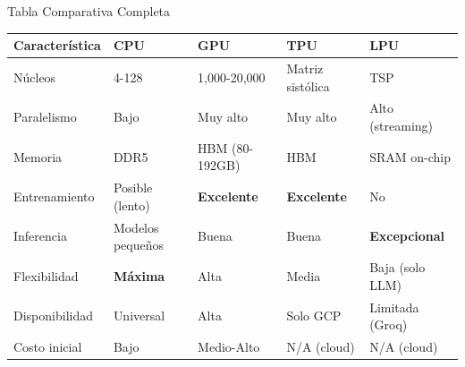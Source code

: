\documentclass[aspectratio=169]{beamer}
\begin{document}
\begin{frame}{Tabla Comparativa Completa}
    \begin{table}[]
        \centering
        \renewcommand{\arraystretch}{1.2}
        \scriptsize
        \begin{tabular}{p{2.3cm} p{2.5cm} p{2.8cm} p{2.8cm} p{2.8cm}}
            \toprule
            \textbf{Característica} & \textbf{CPU} & \textbf{GPU} & \textbf{TPU} & \textbf{LPU} \\
            \midrule
            Núcleos & 4-128 & 1,000-20,000 & Matriz sistólica & TSP \\
            Paralelismo & Bajo & Muy alto & Muy alto & Alto (streaming) \\
            Memoria & DDR5 & HBM (80-192GB) & HBM & SRAM on-chip \\
            Entrenamiento & Posible (lento) & \textbf{Excelente} & \textbf{Excelente} & No \\
            Inferencia & Modelos pequeños & Buena & Buena & \textbf{Excepcional} \\
            Flexibilidad & \textbf{Máxima} & Alta & Media & Baja (solo LLM) \\
            Disponibilidad & Universal & Alta & Solo GCP & Limitada (Groq) \\
            Costo inicial & Bajo & Medio-Alto & N/A (cloud) & N/A (cloud) \\
            \bottomrule
        \end{tabular}
    \end{table}
\end{frame}
\end{document}

